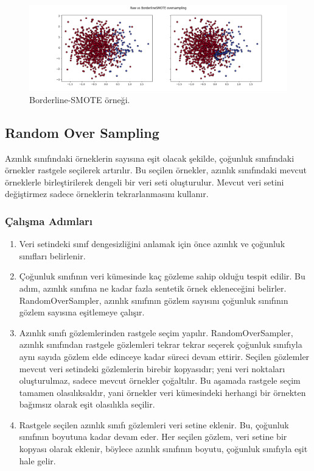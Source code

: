 \begin{figure}[h]
    \centering
    \includegraphics[width=1\textwidth]{images/Raw vs BorderlineSMOTE oversampling.png}
    \caption{Borderline-SMOTE örneği.}
    \label{fig:enter-label}
\end{figure}

\newpage

\subsection{Random Over Sampling}
Azınlık sınıfındaki örneklerin sayısına eşit olacak şekilde, çoğunluk sınıfındaki örnekler rastgele seçilerek artırılır. Bu seçilen örnekler, azınlık sınıfındaki mevcut örneklerle birleştirilerek dengeli bir veri seti oluşturulur. Mevcut veri setini değiştirmez sadece örneklerin tekrarlanmasını kullanır.

\subsubsection{Çalışma Adımları}

\begin{enumerate}
    \item Veri setindeki sınıf dengesizliğini anlamak için önce azınlık ve çoğunluk sınıfları belirlenir.
    \item Çoğunluk sınıfının veri kümesinde kaç gözleme sahip olduğu tespit edilir. Bu adım, azınlık sınıfına ne kadar fazla sentetik örnek ekleneceğini belirler. RandomOverSampler, azınlık sınıfının gözlem sayısını çoğunluk sınıfının gözlem sayısına eşitlemeye çalışır.
    \item Azınlık sınıfı gözlemlerinden rastgele seçim yapılır. RandomOverSampler, azınlık sınıfından rastgele gözlemleri tekrar tekrar seçerek çoğunluk sınıfıyla aynı sayıda gözlem elde edinceye kadar süreci devam ettirir. Seçilen gözlemler mevcut veri setindeki gözlemlerin birebir kopyasıdır; yeni veri noktaları oluşturulmaz, sadece mevcut örnekler çoğaltılır. Bu aşamada rastgele seçim tamamen olasılıksaldır, yani örnekler veri kümesindeki herhangi bir örnekten bağımsız olarak eşit olasılıkla seçilir.
    \item Rastgele seçilen azınlık sınıfı gözlemleri veri setine eklenir. Bu, çoğunluk sınıfının boyutuna kadar devam eder. Her seçilen gözlem, veri setine bir kopyası olarak eklenir, böylece azınlık sınıfının boyutu, çoğunluk sınıfıyla eşit hale gelir.
\end{enumerate}

